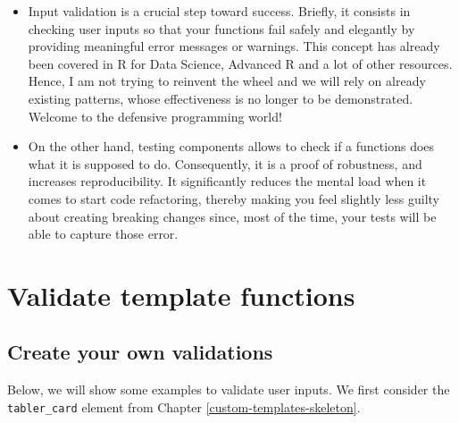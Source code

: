 \documentclass[
]{book}
\providecommand{\tightlist}{%
  \setlength{\itemsep}{0pt}\setlength{\parskip}{0pt}}
\begin{document}
\begin{itemize}
\tightlist
\item
  Input validation is a crucial step toward success. Briefly, it consists in checking user inputs so that your functions fail safely and elegantly by providing meaningful error messages or warnings. This concept has already been covered in R for Data Science, Advanced R and a lot of other resources. Hence, I am not trying to reinvent the wheel and we will rely on already existing patterns, whose effectiveness is no longer to be demonstrated. Welcome to the defensive programming world!
\item
  On the other hand, testing components allows to check if a functions does what it is supposed to do. Consequently, it is a proof of robustness, and increases reproducibility. It significantly reduces the mental load when it comes to start code refactoring, thereby making you feel slightly less guilty about creating breaking changes since, most of the time, your tests will be able to capture those error.
\end{itemize}

\hypertarget{validate-template-functions}{%
\section{Validate template functions}\label{validate-template-functions}}

\hypertarget{create-your-own-validations}{%
\subsection{Create your own validations}\label{create-your-own-validations}}

Below, we will show some examples to validate user inputs. We first consider the \texttt{tabler\_card} element from Chapter \ref{custom-templates-skeleton}.
\end{document}

